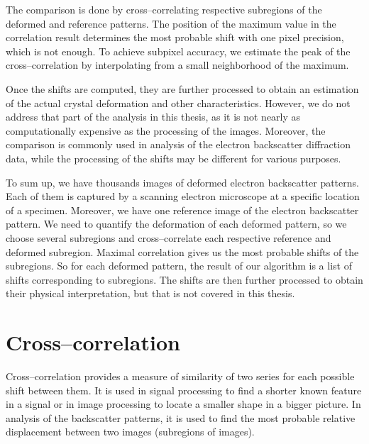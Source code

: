 The comparison is done by cross--correlating respective subregions of the deformed and reference patterns. The position of the maximum value in the correlation result determines the most probable shift with one pixel precision, which is not enough. To achieve subpixel accuracy, we estimate the peak of the cross--correlation by interpolating from a small neighborhood of the maximum.

Once the shifts are computed, they are further processed to obtain an estimation of the actual crystal deformation and other characteristics. However, we do not address that part of the analysis in this thesis, as it is not nearly as computationally expensive as the processing of the images. Moreover, the comparison is commonly used in analysis of the electron backscatter diffraction data, while the processing of the shifts may be different for various purposes.

To sum up, we have thousands images of deformed electron backscatter patterns. Each of them is captured by a scanning electron microscope at a specific location of a specimen. Moreover, we have one reference image of the electron backscatter pattern. We need to quantify the deformation of each deformed pattern, so we choose several subregions and cross--correlate each respective reference and deformed subregion. Maximal correlation gives us the most probable shifts of the subregions. So for each deformed pattern, the result of our algorithm is a list of shifts corresponding to subregions. The shifts are then further processed to obtain their physical interpretation, but that is not covered in this thesis.


\section{Cross--correlation}
\label{cross-corr-def}
Cross--correlation provides a measure of similarity of two series for each possible shift between them. It is used in signal processing to find a shorter known feature in a signal or in image processing to locate a smaller shape in a bigger picture. In analysis of the backscatter patterns, it is used to find the most probable relative displacement between two images (subregions of images).

